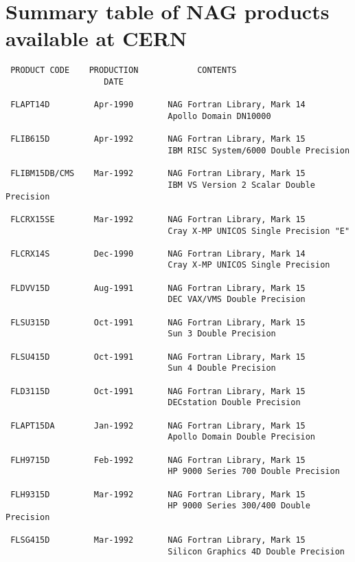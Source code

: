\chapter{Summary table of NAG products available at CERN}
 
\begin{verbatim}
 PRODUCT CODE    PRODUCTION            CONTENTS
                    DATE
 
 FLAPT14D         Apr-1990       NAG Fortran Library, Mark 14
                                 Apollo Domain DN10000
 
 FLIB615D         Apr-1992       NAG Fortran Library, Mark 15
                                 IBM RISC System/6000 Double Precision
 
 FLIBM15DB/CMS    Mar-1992       NAG Fortran Library, Mark 15
                                 IBM VS Version 2 Scalar Double Precision
 
 FLCRX15SE        Mar-1992       NAG Fortran Library, Mark 15
                                 Cray X-MP UNICOS Single Precision "E"
 
 FLCRX14S         Dec-1990       NAG Fortran Library, Mark 14
                                 Cray X-MP UNICOS Single Precision
 
 FLDVV15D         Aug-1991       NAG Fortran Library, Mark 15
                                 DEC VAX/VMS Double Precision
 
 FLSU315D         Oct-1991       NAG Fortran Library, Mark 15
                                 Sun 3 Double Precision
 
 FLSU415D         Oct-1991       NAG Fortran Library, Mark 15
                                 Sun 4 Double Precision
 
 FLD3115D         Oct-1991       NAG Fortran Library, Mark 15
                                 DECstation Double Precision
 
 FLAPT15DA        Jan-1992       NAG Fortran Library, Mark 15
                                 Apollo Domain Double Precision
 
 FLH9715D         Feb-1992       NAG Fortran Library, Mark 15
                                 HP 9000 Series 700 Double Precision
 
 FLH9315D         Mar-1992       NAG Fortran Library, Mark 15
                                 HP 9000 Series 300/400 Double Precision
 
 FLSG415D         Mar-1992       NAG Fortran Library, Mark 15
                                 Silicon Graphics 4D Double Precision
 

\end{verbatim}
